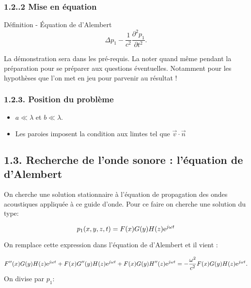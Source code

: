 \documentclass[french, a4paper, 10pt, twocolumn, landscape]{article}
\begin{document}
\subsubsection*{1.2..2 Mise en équation}

\begin{definition}{Définition - Équation de d'Alembert}
	\begin{equation}
		\Delta p_1 -\frac{1}{c^2}\frac{\partial^2 p_1}{\partial t^2}.
	\end{equation}
\end{definition}
La démonstration sera dans les pré-requis. La noter quand même pendant la préparation pour se préparer aux questions éventuelles. Notamment pour les hypothèses que l'on met en jeu pour parvenir au résultat ! 

\subsubsection*{1.2.3. Position du problème}


\begin{itemize}
	\item $a\ll\lambda$ et $b\ll \lambda$.
	\item Les paroies imposent la condition aux limtes tel que $\vec{v}\cdot \vec{n}$
\end{itemize}

\subsection*{1.3. Recherche de l'onde sonore : l'équation de d'Alembert}
On cherche une solution stationnaire à l'équation de propagation des ondes acoustiques appliquée à ce guide d'onde. Pour ce faire on cherche une solution du type:

\begin{equation}
	p_1(x,y,z,t) = F(x)G(y)H(z){\rm e}^{j\omega t}
\end{equation}

On remplace cette expression dans l'équation de d'Alembert et il vient : 

\begin{dmath}
F''(x)G(y)H(z){\rm e}^{j\omega t}+ F(x)G''(y)H(z){\rm e}^{j\omega t} + F(x)G(y)H''(z){\rm e}^{j\omega t}=-\frac{\omega^2}{c^2}F(x)G(y)H(z){\rm e}^{j\omega t}.
\end{dmath}
On divise par $p_1$: 
\end{document}
